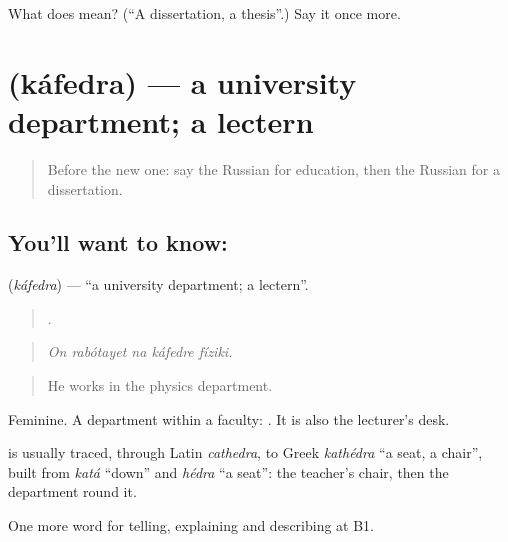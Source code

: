 \begin{tcolorbox}[breakable,colback=teal!4,colframe=teal!35!black,title={Before you move on}]
What does  mean? (\textquotedblleft{}A dissertation, a thesis\textquotedblright{}.) Say it once more.
\end{tcolorbox}
\section[\texorpdfstring{\ru{кафедра} (káfedra)}{кафедра (káfedra)}]{ (káfedra) — a university department; a lectern}

\label{lesson:RU-C385-kafedra}



\begin{quote}
Before the new one: say the Russian for education, then the Russian for a dissertation.
\end{quote}

\subsection*{You'll want to know: }
\textbf{} (\emph{káfedra}) — \textquotedblleft{}a university department; a lectern\textquotedblright{}.

\begin{quote}
    .
\end{quote}

\begin{quote}
\emph{On rabótayet na káfedre fíziki.}
\end{quote}

\begin{quote}
He works in the physics department.
\end{quote}

Feminine. A department within a faculty: \emph{ }. It is also the lecturer’s desk.

\begin{cousinweb}
\textbf{} is usually traced, through Latin \emph{cathedra}, to Greek \emph{kathédra} \textquotedblleft{}a seat, a chair\textquotedblright{}, built from \emph{katá} \textquotedblleft{}down\textquotedblright{} and \emph{hédra} \textquotedblleft{}a seat\textquotedblright{}: the teacher’s chair, then the department round it.
\end{cousinweb}

\begin{grammarlens}[title={What you've built}]
One more word for telling, explaining and describing at B1.
\end{grammarlens}


